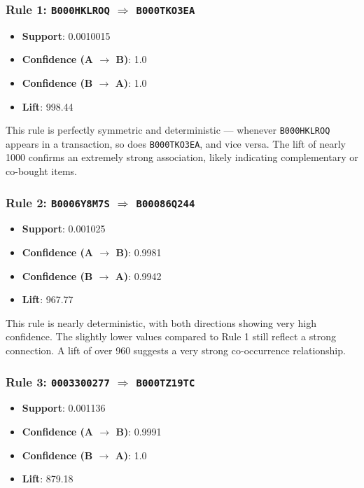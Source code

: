\documentclass[a4paper,12pt]{article}
\begin{document}
\subsubsection*{Rule 1: \texttt{B000HKLROQ} $\Rightarrow$ \texttt{B000TKO3EA}}

\begin{itemize}
    \item \textbf{Support}: 0.0010015
    \item \textbf{Confidence (A $\rightarrow$ B)}: 1.0
    \item \textbf{Confidence (B $\rightarrow$ A)}: 1.0
    \item \textbf{Lift}: 998.44
\end{itemize}

This rule is perfectly symmetric and deterministic — whenever \texttt{B000HKLROQ} appears in a transaction, so does \texttt{B000TKO3EA}, and vice versa. The lift of nearly 1000 confirms an extremely strong association, likely indicating complementary or co-bought items.

\subsubsection*{Rule 2: \texttt{B0006Y8M7S} $\Rightarrow$ \texttt{B00086Q244}}

\begin{itemize}
    \item \textbf{Support}: 0.001025
    \item \textbf{Confidence (A $\rightarrow$ B)}: 0.9981
    \item \textbf{Confidence (B $\rightarrow$ A)}: 0.9942
    \item \textbf{Lift}: 967.77
\end{itemize}

This rule is nearly deterministic, with both directions showing very high confidence. The slightly lower values compared to Rule 1 still reflect a strong connection. A lift of over 960 suggests a very strong co-occurrence relationship.

\subsubsection*{Rule 3: \texttt{0003300277} $\Rightarrow$ \texttt{B000TZ19TC}}

\begin{itemize}
    \item \textbf{Support}: 0.001136
    \item \textbf{Confidence (A $\rightarrow$ B)}: 0.9991
    \item \textbf{Confidence (B $\rightarrow$ A)}: 1.0
    \item \textbf{Lift}: 879.18
\end{itemize}
\end{document}
